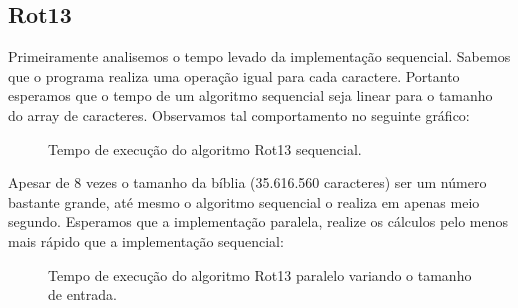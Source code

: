 \documentclass[12pt]{article}
\begin{document}
\subsection{Rot13}

Primeiramente analisemos o tempo levado da implementação sequencial.
Sabemos que o programa realiza uma operação igual para cada caractere.
Portanto esperamos que o tempo de um algoritmo sequencial seja linear
para o tamanho do array de caracteres. Observamos tal comportamento no
seguinte gráfico:

\begin{figure}[H]
    \caption{Tempo de execução do algoritmo Rot13 sequencial.}
\end{figure}

Apesar de 8 vezes o tamanho da bíblia (35.616.560 caracteres) ser um
número bastante grande, até mesmo o algoritmo sequencial o realiza em
apenas meio segundo. Esperamos que a implementação paralela, realize os
cálculos pelo menos mais rápido que a implementação sequencial:

\begin{figure}[H]
    \caption{Tempo de execução do algoritmo Rot13 paralelo variando o
    tamanho de entrada.}
\end{figure}
\end{document}
